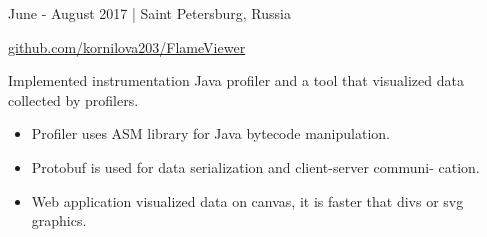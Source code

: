 \documentclass[9pt]{article}
\begin{document}
\begin{multicols}{2}
\color{gray} June - August 2017 | Saint Petersburg, Russia \color{black}

\href{https://github.com/kornilova203/FlameViewer}{github.com/kornilova203/FlameViewer}

\vspace{0.3em}

Implemented instrumentation Java profiler and a tool that visualized data collected by profilers.

\begin{itemize}
\item Profiler uses ASM library for Java bytecode manipulation.
\item Protobuf is used for data serialization and client-server communi- cation.
\item Web application visualized data on canvas, it is faster that divs or svg graphics.
\end{itemize}





\end{multicols}
\end{document}
